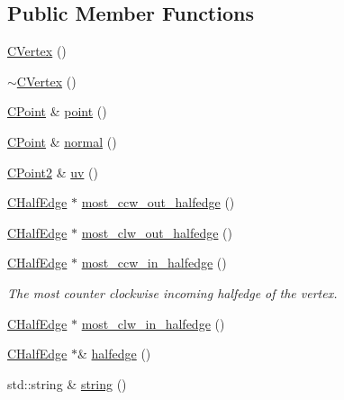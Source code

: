 \subsection*{Public Member Functions}
\begin{DoxyCompactItemize}
\item 
\hyperlink{class_mesh_lib_1_1_c_vertex_ac97920fc9fe1786a2199b02e0bdcea27}{C\+Vertex} ()
\item 
\hyperlink{class_mesh_lib_1_1_c_vertex_a7e93bbcd7e264d336f1e935b466118d5}{$\sim$\+C\+Vertex} ()
\item 
\hyperlink{class_mesh_lib_1_1_c_point}{C\+Point} \& \hyperlink{class_mesh_lib_1_1_c_vertex_aee899036f88e50121d455b37e4345fad}{point} ()
\item 
\hyperlink{class_mesh_lib_1_1_c_point}{C\+Point} \& \hyperlink{class_mesh_lib_1_1_c_vertex_ad969307c4a9e91e8a7a19d2f16bbdd03}{normal} ()
\item 
\hyperlink{class_mesh_lib_1_1_c_point2}{C\+Point2} \& \hyperlink{class_mesh_lib_1_1_c_vertex_aebb4e0369c2d1c21f2f46287a0c9e4d5}{uv} ()
\item 
\hyperlink{class_mesh_lib_1_1_c_half_edge}{C\+Half\+Edge} $\ast$ \hyperlink{class_mesh_lib_1_1_c_vertex_a2de79af92df8f39c851e811c2ee20b09}{most\+\_\+ccw\+\_\+out\+\_\+halfedge} ()
\item 
\hyperlink{class_mesh_lib_1_1_c_half_edge}{C\+Half\+Edge} $\ast$ \hyperlink{class_mesh_lib_1_1_c_vertex_af5fd1d56b98c3e6b1e6c29b2a40067f7}{most\+\_\+clw\+\_\+out\+\_\+halfedge} ()
\item 
\hyperlink{class_mesh_lib_1_1_c_half_edge}{C\+Half\+Edge} $\ast$ \hyperlink{class_mesh_lib_1_1_c_vertex_ae25573c3fc9a3a1ff08f95ed637879d1}{most\+\_\+ccw\+\_\+in\+\_\+halfedge} ()
\begin{DoxyCompactList}\small\item\em The most counter clockwise incoming halfedge of the vertex. \end{DoxyCompactList}\item 
\hyperlink{class_mesh_lib_1_1_c_half_edge}{C\+Half\+Edge} $\ast$ \hyperlink{class_mesh_lib_1_1_c_vertex_a88f960be654aa5d907bca82846baf83f}{most\+\_\+clw\+\_\+in\+\_\+halfedge} ()
\item 
\hyperlink{class_mesh_lib_1_1_c_half_edge}{C\+Half\+Edge} $\ast$\& \hyperlink{class_mesh_lib_1_1_c_vertex_a9329743f6b46a232759cfc41263d89cf}{halfedge} ()
\item 
std\+::string \& \hyperlink{class_mesh_lib_1_1_c_vertex_a6f5a20dd30404c47f118364c60fd1867}{string} ()
\item 

\end{DoxyCompactItemize}
